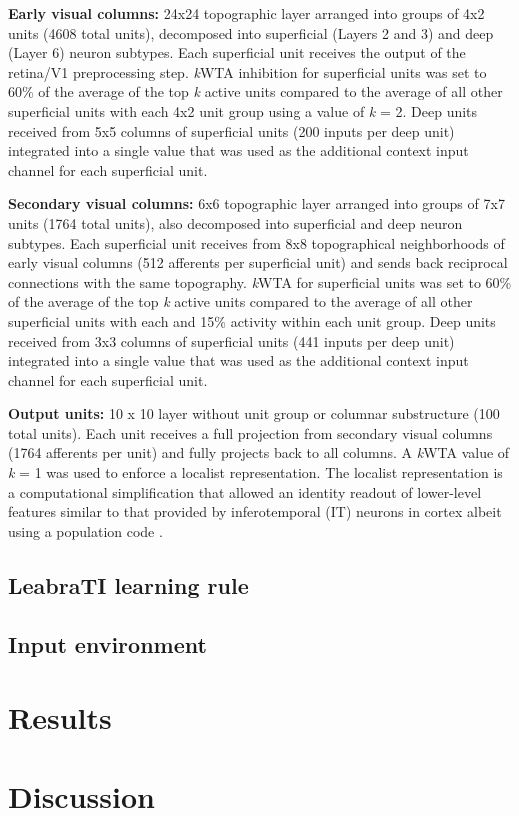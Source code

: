 \documentclass[dwyatte_dissertation.tex]{subfiles}
\begin{document}
\textbf{Early visual columns:} 24x24 topographic layer arranged into groups of 4x2 units (4608 total units), decomposed into superficial (Layers 2 and 3) and deep (Layer 6) neuron subtypes. Each superficial unit receives the output of the retina/V1 preprocessing step. \textit{k}WTA inhibition for superficial units was set to 60\% of the average of the top \textit{k} active units compared to the average of all other superficial units with each 4x2 unit group using a value of \textit{k} = 2. Deep units received from 5x5 columns of superficial units (200 inputs per deep unit) integrated into a single value that was used as the additional context input channel for each superficial unit.

\textbf{Secondary visual columns:} 6x6 topographic layer arranged into groups of 7x7 units (1764 total units), also decomposed into superficial and deep neuron subtypes. Each superficial unit receives from 8x8 topographical neighborhoods of early visual columns (512 afferents per superficial unit) and sends back reciprocal connections with the same topography. \textit{k}WTA for superficial units was set to 60\% of the average of the top \textit{k} active units compared to the average of all other superficial units with each and 15\% activity within each unit group. Deep units received from 3x3 columns of superficial units (441 inputs per deep unit) integrated into a single value that was used as the additional context input channel for each superficial unit.

\textbf{Output units:} 10 x 10 layer without unit group or columnar substructure (100 total units). Each unit receives a full projection from secondary visual columns (1764 afferents per unit) and fully projects back to all columns. A \textit{k}WTA value of \textit{k} = 1 was used to enforce a localist representation. The localist representation is a computational simplification that allowed an identity readout of lower-level features similar to that provided by inferotemporal (IT) neurons in cortex albeit using a population code \cite{HungKreimanPoggioEtAl05,LiCoxZoccolanEtAl09}.


\subsection{LeabraTI learning rule}

\subsection{Input environment}

\section{Results}

\section{Discussion}



\end{document}
